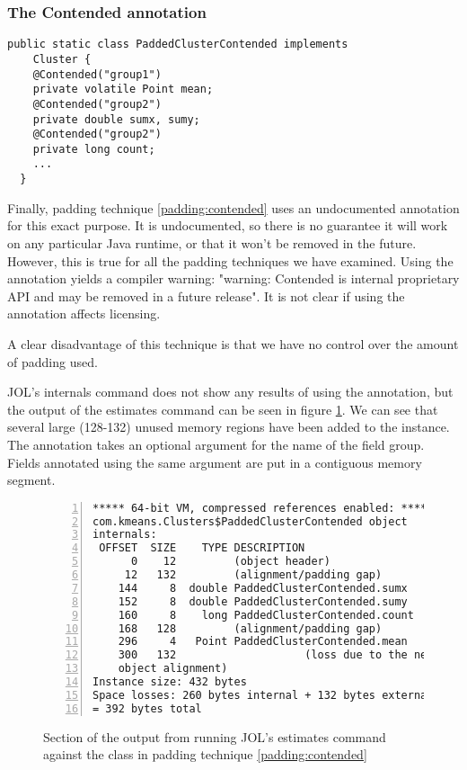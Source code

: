 \subsubsection{The Contended annotation}

\begin{padding}[h]
\begin{Verbatim}[frame=single]
  public static class PaddedClusterContended implements
    Cluster {
    @Contended("group1")
    private volatile Point mean;
    @Contended("group2")
    private double sumx, sumy;
    @Contended("group2")
    private long count;
    ...
  }
\end{Verbatim}
	\caption{}
	\label{padding:contended}
\end{padding}

Finally, padding technique \ref{padding:contended} uses an undocumented
annotation  for this exact purpose. It is undocumented,
so there is no guarantee it will work on any particular Java runtime, or that it
won't be removed in the future. However, this is true for all the padding
techniques we have examined. Using the  annotation yields a
compiler warning: "warning: Contended is internal proprietary API and may be
removed in a future release". It is not clear if using the annotation affects
licensing.

A clear disadvantage of this technique is that we have no control over the
amount of padding used.

JOL's internals command does not show any results of using the 
annotation, but the output of the estimates command can be seen in figure
\ref{jol:contended}. We can see that several large (128-132) unused memory
regions have been added to the instance. The annotation takes an optional
argument for the name of the field group. Fields annotated using the same
argument are put in a contiguous memory segment.

\begin{figure}[h]
\begin{Verbatim}[frame=single, numbers=left]
***** 64-bit VM, compressed references enabled: *****
com.kmeans.Clusters$PaddedClusterContended object
internals:
 OFFSET  SIZE    TYPE DESCRIPTION
      0    12         (object header)
     12   132         (alignment/padding gap)
    144     8  double PaddedClusterContended.sumx
    152     8  double PaddedClusterContended.sumy
    160     8    long PaddedClusterContended.count
    168   128         (alignment/padding gap)
    296     4   Point PaddedClusterContended.mean
    300   132                    (loss due to the next
    object alignment)
Instance size: 432 bytes
Space losses: 260 bytes internal + 132 bytes external
= 392 bytes total
\end{Verbatim}
	\caption{Section of the output from running JOL's estimates command
	against the
	 class in padding technique
	\ref{padding:contended}}
	\label{jol:contended}
\end{figure}
